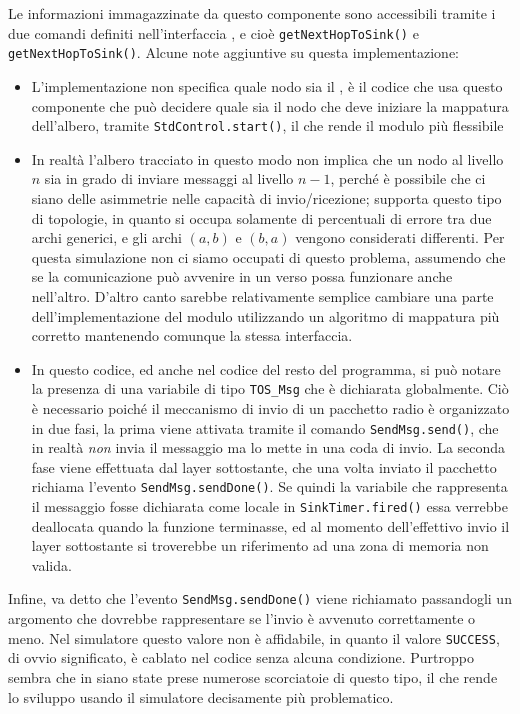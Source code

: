 \documentclass[twoside,11pt,a4paper,italian,openany]{book}
\begin{document}
Le informazioni immagazzinate da questo componente sono accessibili tramite i due comandi 
definiti nell'interfaccia \treedata, e cioè \texttt{getNextHopToSink()} e \texttt{getNextHopToSink()}. 
Alcune note aggiuntive su questa implementazione:
\begin{itemize}
\item{L'implementazione non specifica quale nodo sia il \sink, è il codice che usa questo 
componente che può decidere quale sia il nodo che deve iniziare la mappatura dell'albero, 
tramite \texttt{StdControl.start()}, il che rende il modulo più flessibile}

\item{In realtà l'albero tracciato in questo modo non implica che un nodo al livello $n$ sia in 
grado di inviare messaggi al livello $n-1$, perché è possibile che ci siano delle asimmetrie 
nelle capacità di invio/ricezione; \tos supporta questo tipo di topologie, in quanto si 
occupa solamente di percentuali di errore tra due archi generici, e gli archi $(a,b)$ e $(b,a)$ 
vengono considerati differenti. Per questa simulazione non ci siamo occupati di questo problema,
assumendo che se la comunicazione può avvenire in un verso possa funzionare anche nell'altro. 
D'altro canto sarebbe relativamente semplice cambiare una parte dell'implementazione del modulo \tree utilizzando un algoritmo di mappatura più corretto mantenendo comunque la stessa 
interfaccia.}

\item{In questo codice, ed anche nel codice del resto del programma, si può notare la presenza 
di una variabile di tipo \texttt{TOS\_Msg} che è dichiarata globalmente.
Ciò è necessario poiché il meccanismo di invio di un pacchetto radio è organizzato in due fasi, 
la prima viene attivata tramite il comando \texttt{SendMsg.send()}, che in realtà \emph{non} 
invia il messaggio ma lo mette in una coda di invio.
La seconda fase viene effettuata dal layer sottostante, che una volta inviato il pacchetto 
richiama l'evento \texttt{SendMsg.sendDone()}. 
Se quindi la variabile che rappresenta il messaggio fosse dichiarata come locale in 
\texttt{SinkTimer.fired()} essa verrebbe deallocata quando la funzione terminasse,  
ed al momento dell'effettivo invio il layer sottostante si troverebbe un riferimento 
ad una zona di memoria non valida. }
\end{itemize}

Infine, va detto che l'evento \texttt{SendMsg.sendDone()} viene richiamato passandogli un argomento che  dovrebbe rappresentare se l'invio è avvenuto correttamente o meno. 
Nel simulatore questo valore non è affidabile, in quanto il valore \texttt{SUCCESS}, di ovvio significato, è cablato nel codice senza alcuna condizione. 
Purtroppo sembra che in \tos siano state prese numerose scorciatoie di questo tipo, il che 
rende lo sviluppo usando il simulatore decisamente più problematico. 
\end{document}
